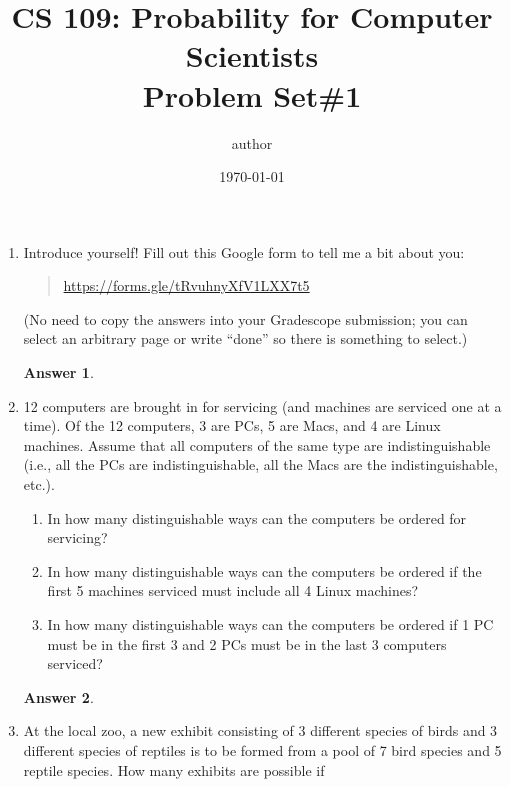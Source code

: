 \documentclass[12pt]{article}
\title{CS 109: Probability for Computer Scientists\\Problem Set\#1}
\author{author} %
\date{\today} %
\renewcommand{\(}{\left(}
\renewcommand{\)}{\right)}
\theoremstyle{definition}
\newtheorem*{answer}{Answer}
\begin{document}
\maketitle

\begin{enumerate}
\item Introduce yourself! Fill out this Google form to tell me a bit about you:
\begin{quote}
\url{https://forms.gle/tRvuhnyXfV1LXX7t5}
\end{quote}

(No need to copy the answers into your Gradescope submission; you can select an arbitrary page or write ``done'' so there is something to select.)

    \begin{shaded}
    \begin{answer}

    \end{answer}
    \end{shaded}
    \newpage


\item 12 computers are brought in for servicing (and machines are serviced one at a time).  Of the 12 computers, 3 are PCs, 5 are Macs, and 4 are Linux machines.  Assume that all computers of the same type are indistinguishable (i.e., all the PCs are indistinguishable, all the Macs are the indistinguishable, etc.).
    \begin{enumerate}[label=\alph*.]

    \item In how many distinguishable ways can the computers be ordered for servicing?
    \item In how many distinguishable ways can the computers be ordered if the first 5 machines serviced must include all 4 Linux machines?
    \item In how many distinguishable ways can the computers be ordered if 1 PC must be in the first 3 and 2 PCs must be in the last 3 computers serviced?

    \end{enumerate}

    \begin{shaded}
    \begin{answer}

    \end{answer}
    \end{shaded}
    \newpage


\item At the local zoo, a new exhibit consisting of 3 different species of birds and 3 different species of reptiles is to be formed from a pool of 7 bird species and 5 reptile species. How many exhibits are possible if


\end{enumerate}
\end{document}

